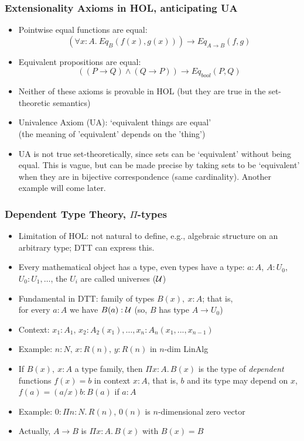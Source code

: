 \documentclass[handout]{beamer}
\newcommand{\depi}[3]{\Pi{#1{:}#2.\,#3}}
\newcommand{\UU}{{\cal U}}
\begin{document}
\frame
  {

    \frametitle{Extensionality Axioms in HOL, anticipating UA}

    \begin{itemize}[<+->]
    \item Pointwise equal functions are equal:
    \[(\forall x:A.~Eq_B(f(x),g(x))) \to Eq_{A\to B}(f,g)\]
    \item Equivalent propositions are equal:
    \[((P\to Q)\land(Q\to P)) \to Eq_{bool}(P,Q)\]
    \item Neither of these axioms is provable in HOL (but they are true in the set-theoretic semantics)
    \item Univalence Axiom (UA): `equivalent things are equal'\\
    (the meaning of 'equivalent' depends on the 'thing')
    \item UA is not true set-theoretically, since sets can be `equivalent'
    without being equal. This is vague, but can be made precise by
    taking sets to be `equivalent' when they are in bijective correspondence (same cardinality).
    Another example will come later.
    \end{itemize}
  }




\frame
  {

    \frametitle{Dependent Type Theory, $\Pi$-types}

    \begin{itemize}[<+->]
    \item Limitation of HOL: not natural to define, e.g.,
               algebraic structure on an arbitrary type; DTT can express this.
    \item Every mathematical object has a type, even types have a type:
    $a:A$, $A:U_0$, $U_0:U_1,\ldots$, the $U_i$ are called universes ($\UU$)
    \item Fundamental in DTT: family of types $B(x),~x:A$; that is,\\
    for every $a:A$ we have $B(a):\UU$  (so, $B$ has type $A\to U_0$)
    \item Context: $x_1:A_1,\,x_2:A_2(x_1), \ldots , x_n : A_n(x_1,...,x_{n-1})$
    \item Example: $n:N,\,x: R(n), \,y: R(n)$ in $n$-dim LinAlg
    \item If $B(x),~x:A$ a type family, then $\depi{x}{A}{B(x)}$
    is the type of \emph{dependent} functions %
    $f(x)=b$ in context $x:A$, that is,
    $b$ {\color{red} and its type} may depend on $x$, $f(a)=(a/x)b : B(a)$ if $a:A$
   \item Example: $0:\depi{n}{N}{R(n)}$, $0(n)$ is $n$-dimensional zero vector
    \item Actually, $A\to B$ is $\depi{x}{A}{B(x)}$ with $B(x)=B$
    \end{itemize}
  }
\end{document}
